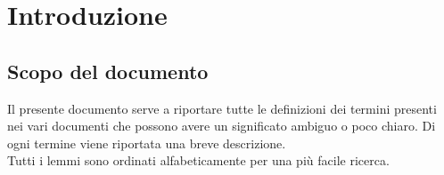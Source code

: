 \section{Introduzione}{
	\subsection{Scopo del documento}{
		Il presente documento serve a riportare tutte le definizioni dei termini presenti nei vari documenti che possono avere un significato ambiguo o poco chiaro. Di ogni termine viene riportata una breve descrizione.\\
		Tutti i lemmi sono ordinati alfabeticamente per una più facile ricerca.
	 }
}